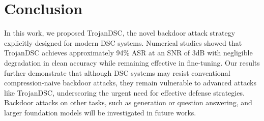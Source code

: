 \documentclass[journal]{IEEEtran}
\begin{document}
\section{Conclusion }
In this work, we proposed TrojanDSC, the novel backdoor attack strategy explicitly designed for modern DSC systems.
Numerical studies showed that TrojanDSC achieves approximately 94\% ASR at an SNR of $3$dB with negligible degradation in clean accuracy while remaining effective in fine-tuning.
Our results further demonstrate that although DSC systems may resist conventional compression-naive backdoor attacks, they remain vulnerable to advanced attacks like TrojanDSC, underscoring the urgent need for effective defense strategies.
{Backdoor attacks on other tasks, such as generation or question answering, and larger foundation models will be investigated in future works.}




 
   
\vspace{12pt}
\end{document}
